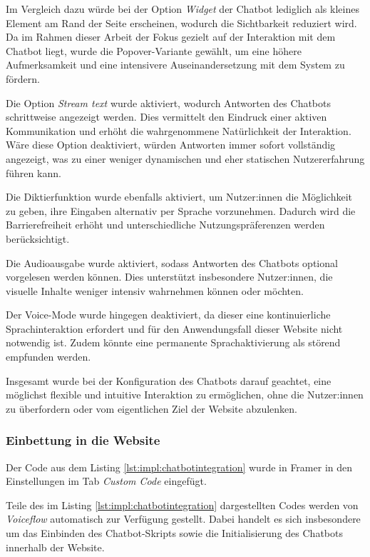 Im Vergleich dazu würde bei der Option \textit{Widget} der Chatbot lediglich 
als kleines Element am Rand der Seite erscheinen, wodurch die Sichtbarkeit 
reduziert wird. 
Da im Rahmen dieser Arbeit der Fokus gezielt auf der Interaktion mit dem 
Chatbot liegt, wurde die Popover-Variante gewählt, um eine höhere 
Aufmerksamkeit und eine intensivere Auseinandersetzung mit dem System 
zu fördern.

Die Option \textit{Stream text} wurde aktiviert, wodurch Antworten des 
Chatbots schrittweise angezeigt werden. Dies vermittelt den Eindruck 
einer aktiven Kommunikation und erhöht die wahrgenommene Natürlichkeit 
der Interaktion. Wäre diese Option deaktiviert, würden Antworten immer sofort 
vollständig angezeigt, was zu einer weniger dynamischen und eher statischen 
Nutzererfahrung führen kann.

Die Diktierfunktion wurde ebenfalls aktiviert, um Nutzer:innen die 
Möglichkeit zu geben, ihre Eingaben alternativ per Sprache vorzunehmen. 
Dadurch wird die Barrierefreiheit erhöht und unterschiedliche 
Nutzungspräferenzen werden berücksichtigt.

Die Audioausgabe wurde aktiviert, sodass Antworten des Chatbots optional 
vorgelesen werden können. Dies unterstützt insbesondere Nutzer:innen, die 
visuelle Inhalte weniger intensiv wahrnehmen können oder möchten.

Der Voice-Mode wurde hingegen deaktiviert, da dieser eine kontinuierliche 
Sprachinteraktion erfordert und für den Anwendungsfall dieser Website nicht 
notwendig ist. Zudem könnte eine permanente Sprachaktivierung als störend 
empfunden werden.

Insgesamt wurde bei der Konfiguration des Chatbots darauf geachtet, eine 
möglichst flexible und intuitive Interaktion zu ermöglichen, ohne 
die Nutzer:innen zu überfordern oder vom eigentlichen Ziel der 
Website abzulenken.

\subsubsection{Einbettung in die Website}
Der Code aus dem Listing \ref{lst:impl:chatbotintegration} wurde
in Framer in den Einstellungen im Tab \textit{Custom Code} eingefügt.

Teile des im Listing \ref{lst:impl:chatbotintegration} dargestellten Codes 
werden von \textit{Voiceflow} automatisch zur Verfügung gestellt. 
Dabei handelt es sich insbesondere um das Einbinden des Chatbot-Skripts 
sowie die Initialisierung des Chatbots innerhalb der Website.


